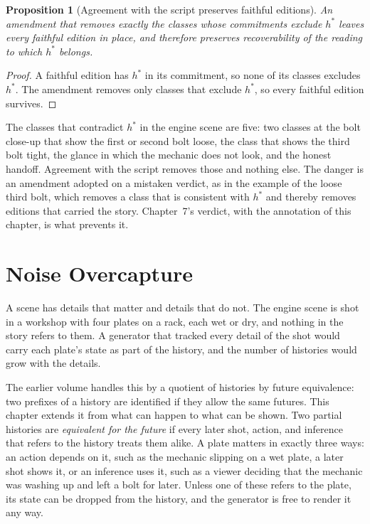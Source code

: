 \documentclass[11pt,twoside,openright]{book}
\theoremstyle{plain}
\newtheorem{proposition}[theorem]{Proposition}
\theoremstyle{definition}
\theoremstyle{remark}
\begin{document}
\begin{proposition}[Agreement with the script preserves faithful editions]\label{prop:agree}
An amendment that removes exactly the classes whose commitments exclude $h^\ast$ leaves every faithful edition in place, and therefore preserves recoverability of the reading to which $h^\ast$ belongs.
\end{proposition}

\begin{proof}
A faithful edition has $h^\ast$ in its commitment, so none of its classes excludes $h^\ast$. The amendment removes only classes that exclude $h^\ast$, so every faithful edition survives.
\end{proof}

The classes that contradict $h^\ast$ in the engine scene are five: two classes at the bolt close-up that show the first or second bolt loose, the class that shows the third bolt tight, the glance in which the mechanic does not look, and the honest handoff. Agreement with the script removes those and nothing else. The danger is an amendment adopted on a mistaken verdict, as in the example of the loose third bolt, which removes a class that is consistent with $h^\ast$ and thereby removes editions that carried the story. Chapter~7's verdict, with the annotation of this chapter, is what prevents it.

\section{Noise Overcapture}\label{sec:noise}

A scene has details that matter and details that do not. The engine scene is shot in a workshop with four plates on a rack, each wet or dry, and nothing in the story refers to them. A generator that tracked every detail of the shot would carry each plate's state as part of the history, and the number of histories would grow with the details.

The earlier volume handles this by a quotient of histories by future equivalence: two prefixes of a history are identified if they allow the same futures. This chapter extends it from what can happen to what can be shown. Two partial histories are \emph{equivalent for the future} if every later shot, action, and inference that refers to the history treats them alike. A plate matters in exactly three ways: an action depends on it, such as the mechanic slipping on a wet plate, a later shot shows it, or an inference uses it, such as a viewer deciding that the mechanic was washing up and left a bolt for later. Unless one of these refers to the plate, its state can be dropped from the history, and the generator is free to render it any way.
\end{document}
